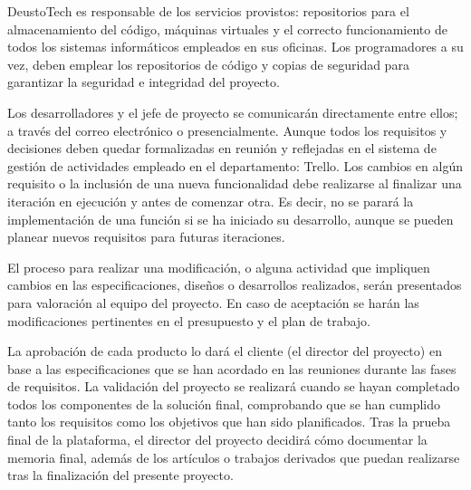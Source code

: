 DeustoTech es responsable de los servicios provistos: repositorios para el
almacenamiento del código, máquinas virtuales y el correcto funcionamiento de
todos los sistemas informáticos empleados en sus oficinas. Los programadores a
su vez, deben emplear los repositorios de código y copias de seguridad para
garantizar la seguridad e integridad del proyecto.

Los desarrolladores y el jefe de proyecto se comunicarán directamente entre
ellos; a través del correo electrónico o presencialmente. Aunque todos los
requisitos y decisiones deben quedar formalizadas en reunión y reflejadas en
el sistema de gestión de actividades empleado en el departamento: Trello. Los
cambios en algún requisito o la inclusión de una nueva funcionalidad debe
realizarse al finalizar una iteración en ejecución y antes de comenzar otra.
Es decir, no se parará la implementación de una función si se ha iniciado
su desarrollo, aunque se pueden planear nuevos requisitos para futuras
iteraciones.

El proceso para realizar una modificación, o alguna actividad que impliquen
cambios en las especificaciones, diseños o desarrollos realizados, serán
presentados para valoración al equipo del proyecto. En caso de aceptación se
harán las modificaciones pertinentes en el presupuesto y el plan de trabajo.

La aprobación de cada producto lo dará el cliente (el director del proyecto) en
base a las especificaciones que se han acordado en las reuniones durante las
fases de requisitos. La validación del proyecto se realizará cuando se hayan
completado todos los componentes de la solución final, comprobando que se han
cumplido tanto los requisitos como los objetivos que han sido planificados.
Tras la prueba final de la plataforma, el director del proyecto decidirá cómo
documentar la memoria final, además de los artículos o trabajos derivados que
puedan realizarse tras la finalización del presente proyecto.
